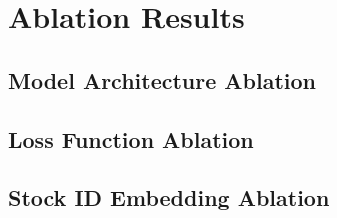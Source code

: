 \section{Ablation Results}

\subsection{Model Architecture Ablation}

\subsection{Loss Function Ablation}

\subsection{Stock ID Embedding Ablation}








